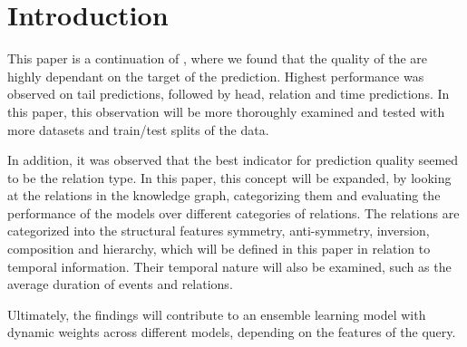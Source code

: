 \section{Introduction}
\label{sec:introduction}



This paper is a continuation of \cite{P9}, where we found that the quality of the are highly dependant on the target of the prediction. Highest performance was observed on tail predictions, followed by head, relation and time predictions. In this paper, this observation will be more thoroughly examined and tested with more datasets and train/test splits of the data.

In addition, it was observed that the best indicator for prediction quality seemed to be the relation type. In this paper, this concept will be expanded, by looking at the relations in the knowledge graph, categorizing them and evaluating the performance of the models over different categories of relations. The relations are categorized into the structural features symmetry, anti-symmetry, inversion, composition and hierarchy, which will be defined in this paper in relation to temporal information. Their temporal nature will also be examined, such as the average duration of events and relations.

Ultimately, the findings will contribute to an ensemble learning model with dynamic weights across different models, depending on the features of the query.